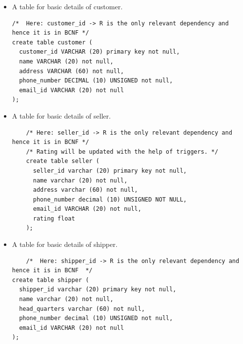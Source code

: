 \documentclass[a4paper,12pt]{article}
\begin{document}
\begin{itemize}
  \item A table for basic details of customer.
  \begin{verbatim}
/*  Here: customer_id -> R is the only relevant dependency and hence it is in BCNF */
create table customer (
  customer_id VARCHAR (20) primary key not null,
  name VARCHAR (20) not null,
  address VARCHAR (60) not null,
  phone_number DECIMAL (10) UNSIGNED not null,
  email_id VARCHAR (20) not null
);
  \end{verbatim}
  \item A table for basic details of seller.
  \begin{verbatim}
    /* Here: seller_id -> R is the only relevant dependency and hence it is in BCNF */
    /* Rating will be updated with the help of triggers. */
    create table seller (
      seller_id varchar (20) primary key not null,
      name varchar (20) not null,
      address varchar (60) not null,
      phone_number decimal (10) UNSIGNED NOT NULL,
      email_id VARCHAR (20) not null,
      rating float
    );
  \end{verbatim}
  \item A table for basic details of shipper.
  \begin{verbatim}
    /*  Here: shipper_id -> R is the only relevant dependency and hence it is in BCNF  */
create table shipper (
  shipper_id varchar (20) primary key not null,
  name varchar (20) not null,
  head_quarters varchar (60) not null,
  phone_number decimal (10) UNSIGNED not null,
  email_id VARCHAR (20) not null
);


\end{verbatim}
\end{itemize}
\end{document}

